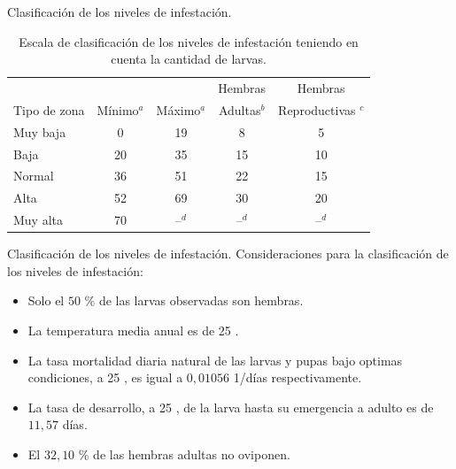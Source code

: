 
\begin{frame}[c]{Clasificación de los niveles de infestación.}
  \begin{table}
    \begin{minipage}{\textwidth}
    \begin{center}
    \caption{\label{tab:cap4-puntaje-zona} Escala de clasificación de los niveles de infestación teniendo en cuenta la cantidad de larvas.}
      \begin{tabular}{l c c c c}
          \hline
                       &          &           & Hembras     & Hembras \\
          Tipo de zona &Mínimo$^a$& Máximo$^a$& Adultas$^b$ & Reproductivas $^c$\\
          \hline
          \hline
          Muy baja  & 0  & 19 & 8  & 5 \\
          Baja    & 20 & 35 & 15 & 10\\
          Normal & 36 & 51 & 22 & 15\\
          Alta   & 52 & 69 & 30 & 20\\
          Muy alta  & 70 & --$^d$  & --$^d$  & --$^d$ \\
      \end{tabular}
      \end{center}
    \end{minipage}
  \end{table}
\end{frame}


\begin{frame}[t]{Clasificación de los niveles de infestación.}
  Consideraciones para la clasificación de los niveles de infestación:
  \begin{itemize}
      \item Solo el $50$ \% de las larvas observadas son hembras.
      \item La temperatura media anual es de 25 \textcelsius.
      \item La tasa mortalidad diaria natural de las larvas y pupas bajo optimas condiciones, a 25 \textcelsius, es igual a $0,01056$ 1/días respectivamente.
      \item La tasa de desarrollo, a 25 \textcelsius, de la larva hasta su emergencia a adulto es de $11,57$ días.
      \item El $32,10$ \% de las hembras adultas no oviponen.
  \end{itemize}
\end{frame}


